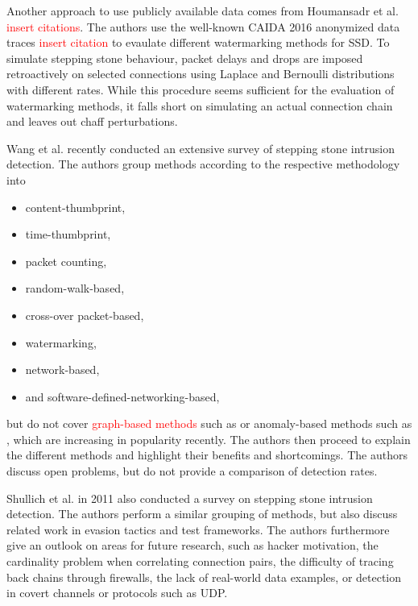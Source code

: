 \documentclass[runningheads]{llncs}\usepackage[]{graphicx}\usepackage[]{color}
\begin{document}
Another approach to use publicly available data comes from Houmansadr et al. \textcolor{red}{insert citations}. The authors use the well-known CAIDA 2016 anonymized data traces \textcolor{red}{insert citation} to evaulate different watermarking methods for SSD. To simulate stepping stone behaviour, packet delays and drops are imposed retroactively on selected connections using Laplace and Bernoulli distributions with different rates. While this procedure seems sufficient for the evaluation of watermarking methods, it falls short on simulating an actual connection chain and leaves out chaff perturbations. 


Wang et al. \cite{wang2018research} recently conducted an extensive survey of  stepping stone intrusion detection. The authors group methods according to the respective methodology into 
\begin{itemize}
\item content-thumbprint,
\item time-thumbprint,
\item packet counting,
\item random-walk-based,
\item cross-over packet-based,
\item watermarking,
\item network-based,
\item and software-defined-networking-based, 
\end{itemize} 
but do not cover \textcolor{red}{graph-based methods} such as \cite{gamarra2018analysis} %
or anomaly-based methods such as \cite{di2011detecting}, which are increasing in popularity recently.
The authors then proceed to explain the different methods and highlight their benefits and shortcomings. The authors discuss open problems, but do not provide a comparison of detection rates. 

Shullich et al. \cite{shullich2011survey} in 2011 also conducted a survey on stepping stone intrusion detection. The authors perform a similar grouping of methods, but also discuss related work in evasion tactics and test frameworks. The authors furthermore give an outlook on areas for future research, such as hacker motivation, the cardinality problem when correlating connection pairs, the difficulty of tracing back chains through firewalls, the lack of real-world data examples, or detection in covert channels or protocols such as UDP.  

\cite{almulhem2007survey}
\end{document}
